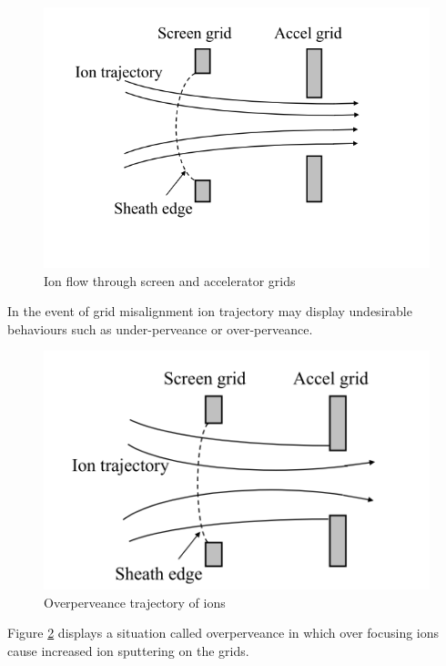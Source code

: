 \begin{figure}[ht]
    \centering
    \includegraphics[scale=0.6]{fig/ionflow.png}
    \caption[Ion flow through screen and accelerator grids]{Ion flow through screen and accelerator grids\cite{williams2013ion}}
    \label{fig:ionflow}
\end{figure}

In the event of grid misalignment ion trajectory may display undesirable behaviours such as under-perveance or over-perveance. 
\begin{figure}[ht]
    \centering
    \includegraphics[scale=0.6]{fig/overperveance.png}
    \caption[Over-perveance trajectory of ions]{Overperveance trajectory of ions\cite{williams2013ion}}
    \label{fig:overperveance}
\end{figure}

Figure \ref{fig:overperveance} displays a situation called overperveance in which over focusing ions cause increased ion sputtering on the grids.

